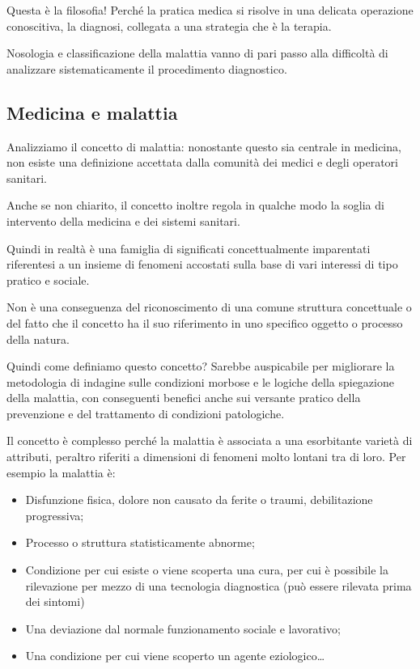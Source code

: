   Questa è la filosofia! Perché la pratica medica si risolve in una
  delicata operazione conoscitiva, la diagnosi, collegata a una
  strategia che è la terapia.

  Nosologia e classificazione della malattia vanno di pari passo alla
  difficoltà di analizzare sistematicamente il procedimento diagnostico.

  \subsection{Medicina e malattia}

  Analizziamo il concetto di malattia: nonostante questo sia centrale in
  medicina, non esiste una definizione accettata dalla comunità dei
  medici e degli operatori sanitari.

  Anche se non chiarito, il concetto inoltre regola in qualche modo la
  soglia di intervento della medicina e dei sistemi sanitari.

  Quindi in realtà è una famiglia di significati concettualmente
  imparentati riferentesi a un insieme di fenomeni accostati sulla base
  di vari interessi di tipo pratico e sociale.

  Non è una conseguenza del riconoscimento di una comune struttura
  concettuale o del fatto che il concetto ha il suo riferimento in uno
  specifico oggetto o processo della natura.

  Quindi come definiamo questo concetto? Sarebbe auspicabile per
  migliorare la metodologia di indagine sulle condizioni morbose e le
  logiche della spiegazione della malattia, con conseguenti benefici
  anche sui versante pratico della prevenzione e del trattamento di
  condizioni patologiche.

  Il concetto è complesso perché la malattia è associata a una
  esorbitante varietà di attributi, peraltro riferiti a dimensioni di
  fenomeni molto lontani tra di loro. Per esempio la malattia è:

\begin{itemize}
\item
  Disfunzione fisica, dolore non causato da ferite o traumi,
  debilitazione progressiva;
\item
  Processo o struttura statisticamente abnorme;
\item
  Condizione per cui esiste o viene scoperta una cura, per cui è
  possibile la rilevazione per mezzo di una tecnologia diagnostica (può
  essere rilevata prima dei sintomi)
\item
  Una deviazione dal normale funzionamento sociale e lavorativo;
\item
  Una condizione per cui viene scoperto un agente eziologico\ldots{}
\end{itemize}


